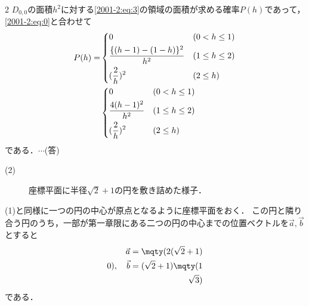 \documentclass[../../../../main.tex]{subfiles}
\begin{document}
\begin{multicols}{2}
  $D_{0,0}$の面積$h^2$に対する\cref{2001-2:eq:3}の領域の面積が求める確率$P(h)$であって，\cref{2001-2:eq:0}と合わせて
  \begin{align*}
    P(h) =
     & \begin{dcases}
         0                             & (0 < h \le 1)   \\
         \frac{\{(h-1)-(1-h)\}^2}{h^2} & (1 \le h \le 2) \\
         (\frac{2}{h})^2               & (2 \le h)
       \end{dcases} \\
     & \begin{dcases}
         0                    & (0 < h \le 1)   \\
         \frac{4(h-1)^2}{h^2} & (1 \le h \le 2) \\
         (\frac{2}{h})^2      & (2 \le h)
       \end{dcases}
  \end{align*}
  である．$\cdots$(答)
  \vspace{10pt}

  (2)

  \begin{figure}[H]
    \centering
    \caption{座標平面に半径$\sqrt{2}+1$の円を敷き詰めた様子．}
    \label{2001-2:fig:4}
  \end{figure}

  (1)と同様に一つの円の中心が原点となるように座標平面をおく．
  この円と隣り合う円のうち，一部が第一章限にある二つの円の中心までの位置ベクトルを$\vec{a},\vec{b}$とすると
  \begin{align*}
    \vec{a} = \mqty(2(\sqrt{2}+1) \\ 0), \quad \vec{b} = (\sqrt{2}+1)\mqty(1 \\ \sqrt{3})
  \end{align*}
  である．

  \begin{figure}[H]
    \centering
    \begin{tikzpicture}


\end{tikzpicture}
\end{figure}
\end{multicols}
\end{document}
